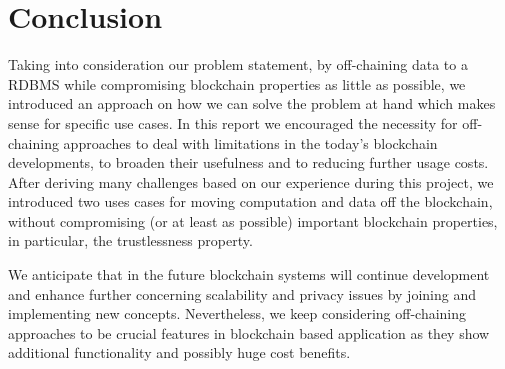 \section{Conclusion}

Taking into consideration our problem statement, by off-chaining data to a RDBMS while compromising blockchain properties as little as possible, we introduced an approach on how we can solve the problem at hand which makes sense for specific use cases. In this report we encouraged the necessity for off-chaining approaches to deal with limitations in the today’s blockchain developments, to broaden their usefulness and to reducing further usage costs. After deriving many challenges based on our experience during this project, we introduced two uses cases for moving computation and data off the blockchain, without compromising (or at least as possible) important blockchain properties, in particular, the trustlessness property.

We anticipate that in the future blockchain systems will continue development and enhance further concerning scalability and privacy issues by joining and implementing new concepts. Nevertheless, we keep considering off-chaining approaches to be crucial features in blockchain based application as they show additional functionality and possibly huge cost benefits.
